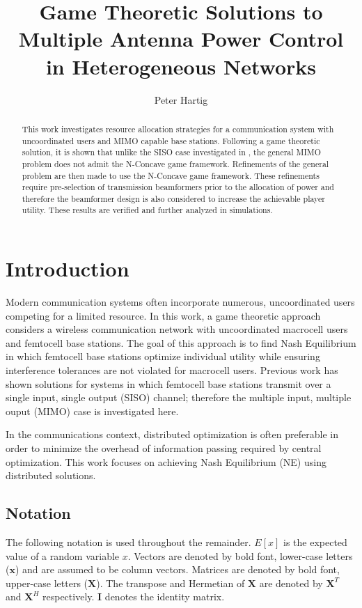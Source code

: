 \documentclass[12pt,a4paper]{report}
\title{Game Theoretic Solutions to Multiple Antenna Power Control in Heterogeneous Networks}
\author{Peter Hartig}
\begin{document}
\maketitle
\begin{abstract}
This work investigates resource allocation strategies for a communication system with uncoordinated users and MIMO capable base stations. Following a game theoretic solution, it is shown that unlike the SISO case investigated in \cite{ghosh2015normalized}, the general MIMO problem does not admit the N-Concave game framework. Refinements of the general problem are then made to use the N-Concave game framework. These refinements require pre-selection of transmission beamformers prior to the allocation of power and therefore the beamformer design is also considered to increase the achievable player utility. These results are verified and further analyzed in simulations.
\end{abstract}
%
\tableofcontents


\chapter{Introduction}
Modern communication systems often incorporate numerous, uncoordinated users competing for a limited resource. In this work, a game theoretic approach considers a wireless communication network with uncoordinated macrocell users and femtocell base stations. The goal of this approach is to find Nash Equilibrium in which femtocell base stations optimize individual utility while ensuring interference tolerances are not violated for macrocell users. 
Previous work has shown solutions for systems in which femtocell base stations transmit over a single input, single output (SISO) channel; therefore the multiple input, multiple ouput (MIMO) case is investigated here. 
\par
In the communications context, distributed optimization is often preferable in order to minimize the overhead of information passing required by central optimization. 
This work focuses on achieving Nash Equilibrium (NE) using distributed solutions. 


\section{Notation}
The following notation is used throughout the remainder. 
$E[x]$ is the expected value of a random variable $x$.
Vectors are denoted by bold font, lower-case letters ($\mathbf{x}$) and are assumed to be column vectors.
Matrices are denoted by bold font, upper-case letters ($\mathbf{X}$). The transpose and Hermetian of $\mathbf{X}$ are denoted by $\mathbf{X}^T$ and $\mathbf{X}^H$ respectively.
$\mathbf{I}$ denotes the identity matrix.
\end{document}
